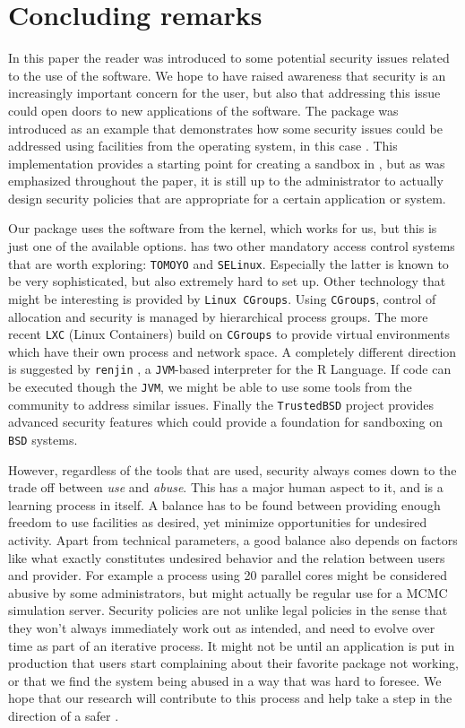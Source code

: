 \section{Concluding remarks}

In this paper the reader was introduced to some potential security issues
related to the use of the \R software. We hope to have raised awareness that
security is an increasingly important concern for the \R user, but also that
addressing this issue could open doors to new applications of the software. The
\RAppArmor package was introduced as an example that demonstrates how some
security issues could be addressed using facilities from the operating system,
in this case \Linux. This implementation provides a starting point for creating
a sandbox in \R, but as was emphasized throughout the paper, it is still up to
the administrator to actually design security policies that are appropriate for
a certain application or system.

Our package uses the \AppArmor software from the \Linux kernel, which works for
us, but this is just one of the available options. \Linux has two other
mandatory access control systems that are worth exploring: \texttt{TOMOYO} and
\texttt{SELinux}. Especially the latter is known to be very sophisticated, but
also extremely hard to set up. Other technology that might be interesting is
provided by \texttt{Linux CGroups}. Using \texttt{CGroups}, control of
allocation and security is managed by hierarchical process groups. The more
recent \texttt{LXC} (Linux Containers) build on \texttt{CGroups} to provide
virtual environments which have their own process and network space. A
completely different direction is suggested by \texttt{renjin} \citep{renjin},
a \texttt{JVM}-based interpreter for the R Language. If \R code can be executed
though the \texttt{JVM}, we might be able to use some tools from the \Java
community to address similar issues. Finally the \texttt{TrustedBSD} project
provides advanced security features which could provide a foundation for
sandboxing \R on \texttt{BSD} systems.

However, regardless of the tools that are used, security always comes down to
the trade off between \emph{use} and \emph{abuse}. This has a major human
aspect to it, and is a learning process in itself. A balance has to be found
between providing enough freedom to use facilities as desired, yet minimize
opportunities for undesired activity. Apart from technical parameters, a good
balance also depends on factors like what exactly constitutes undesired
behavior and the relation between users and provider. For example a process
using 20 parallel cores might be considered abusive by some administrators, but
might actually be regular use for a MCMC simulation server. Security policies
are not unlike legal policies in the sense that they won't always immediately
work out as intended, and need to evolve over time as part of an iterative
process. It might not be until an application is put in production that users
start complaining about their favorite package not working, or that we find the
system being abused in a way that was hard to foresee. We hope that our
research will contribute to this process and help take a step in the direction
of a safer \R.



 